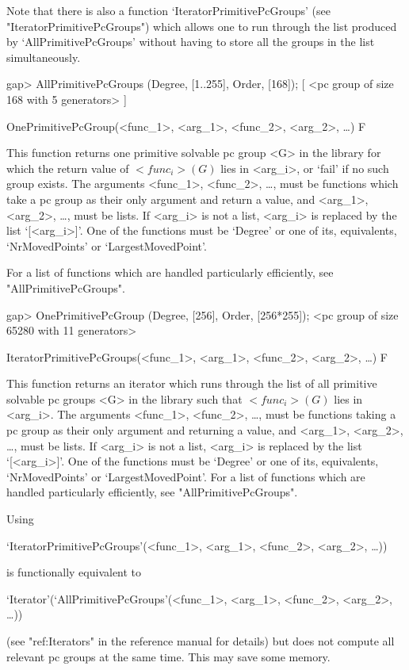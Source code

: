 Note that there is also a function `IteratorPrimitivePcGroups' (see
"IteratorPrimitivePcGroups") which allows one to run through the list produced by
`AllPrimitivePcGroups' without having to store all the groups in the list
simultaneously.

\beginexample
gap> AllPrimitivePcGroups (Degree, [1..255], Order, [168]);
[ <pc group of size 168 with 5 generators> ]
\endexample


\>OnePrimitivePcGroup(<func_1>, <arg_1>, <func_2>, <arg_2>, \dots) F

This function returns one primitive solvable pc
group <G> in the  {\IRREDSOL} library for which the return value of $<func_i>(G)$ lies in
<arg_i>, or `fail' if no such group exists.  The arguments <func_1>, <func_2>, \dots,
must be {\GAP} functions which take a pc group as their only argument and return a
value, and <arg_1>, <arg_2>,
\dots,  must be lists. If <arg_i> is not a list, <arg_i> is replaced by the list
`[<arg_i>]'. One of the functions must be `Degree' or one of its, equivalents, `NrMovedPoints' or `LargestMovedPoint'.

For a list of functions which are handled particularly efficiently, see
"AllPrimitivePcGroups".

\beginexample
gap> OnePrimitivePcGroup (Degree, [256], Order, [256*255]);
<pc group of size 65280 with 11 generators>
\endexample

\>IteratorPrimitivePcGroups(<func_1>, <arg_1>, <func_2>, <arg_2>, \dots) F

This function returns an iterator which runs through the list of all primitive solvable
pc groups <G> in the  {\IRREDSOL} library such that
$<func_i>(G)$ lies in <arg_i>. The arguments <func_1>, <func_2>, \dots,
must be {\GAP} functions taking a pc group as their only argument and returning 
a value, and <arg_1>, <arg_2>, \dots, 
must be lists. If <arg_i> is not a list, <arg_i> is replaced by the list `[<arg_i>]'.
One of the functions must be `Degree' or one of its, equivalents, `NrMovedPoints' 
or `LargestMovedPoint'.
For a list of functions which are handled particularly efficiently, see
"AllPrimitivePcGroups".

Using 

`IteratorPrimitivePcGroups'(<func_1>, <arg_1>, <func_2>, <arg_2>, \dots)) 

is functionally equivalent to 

`Iterator'(`AllPrimitivePcGroups'(<func_1>, <arg_1>, <func_2>, <arg_2>, \dots))

(see "ref:Iterators" in the {\GAP} reference manual for details) but does not 
compute all relevant pc groups at the same time. 
This may save some memory. 


